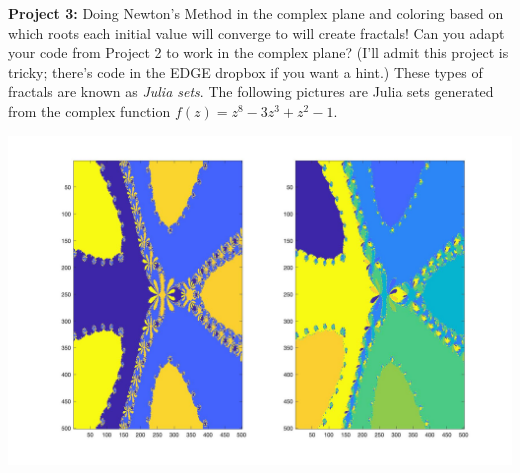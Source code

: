 \documentclass[12pt]{report}
\begin{document}
\textbf{Project 3:} Doing Newton's Method in the complex plane and coloring based on which roots each initial value will converge to will create fractals! Can you adapt your code from Project 2 to work in the complex plane?  (I'll admit this project is tricky; there's code in the EDGE dropbox if you want a hint.) These types of fractals are known as {\it Julia sets}.  The following pictures are Julia sets generated from the complex function $f(z)=z^8-3z^3+z^2-1$. 
\begin{center}
\includegraphics[scale=0.2]{julia.jpg}
\end{center}
\end{document}
